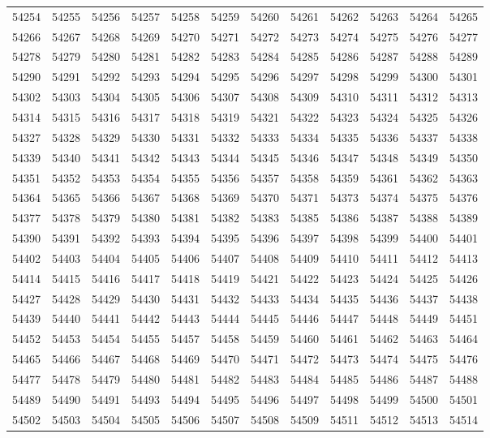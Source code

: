 \begin{center}
\begin{longtable}{llllllllllll}
54254 &54255 &54256 &54257 &54258 &54259 &54260 &54261 &54262 &54263 &54264 &54265 \\
54266 &54267 &54268 &54269 &54270 &54271 &54272 &54273 &54274 &54275 &54276 &54277 \\
54278 &54279 &54280 &54281 &54282 &54283 &54284 &54285 &54286 &54287 &54288 &54289 \\
54290 &54291 &54292 &54293 &54294 &54295 &54296 &54297 &54298 &54299 &54300 &54301 \\
54302 &54303 &54304 &54305 &54306 &54307 &54308 &54309 &54310 &54311 &54312 &54313 \\
54314 &54315 &54316 &54317 &54318 &54319 &54321 &54322 &54323 &54324 &54325 &54326 \\
54327 &54328 &54329 &54330 &54331 &54332 &54333 &54334 &54335 &54336 &54337 &54338 \\
54339 &54340 &54341 &54342 &54343 &54344 &54345 &54346 &54347 &54348 &54349 &54350 \\
54351 &54352 &54353 &54354 &54355 &54356 &54357 &54358 &54359 &54361 &54362 &54363 \\
54364 &54365 &54366 &54367 &54368 &54369 &54370 &54371 &54373 &54374 &54375 &54376 \\
54377 &54378 &54379 &54380 &54381 &54382 &54383 &54385 &54386 &54387 &54388 &54389 \\
54390 &54391 &54392 &54393 &54394 &54395 &54396 &54397 &54398 &54399 &54400 &54401 \\
54402 &54403 &54404 &54405 &54406 &54407 &54408 &54409 &54410 &54411 &54412 &54413 \\
54414 &54415 &54416 &54417 &54418 &54419 &54421 &54422 &54423 &54424 &54425 &54426 \\
54427 &54428 &54429 &54430 &54431 &54432 &54433 &54434 &54435 &54436 &54437 &54438 \\
54439 &54440 &54441 &54442 &54443 &54444 &54445 &54446 &54447 &54448 &54449 &54451 \\
54452 &54453 &54454 &54455 &54457 &54458 &54459 &54460 &54461 &54462 &54463 &54464 \\
54465 &54466 &54467 &54468 &54469 &54470 &54471 &54472 &54473 &54474 &54475 &54476 \\
54477 &54478 &54479 &54480 &54481 &54482 &54483 &54484 &54485 &54486 &54487 &54488 \\
54489 &54490 &54491 &54493 &54494 &54495 &54496 &54497 &54498 &54499 &54500 &54501 \\
54502 &54503 &54504 &54505 &54506 &54507 &54508 &54509 &54511 &54512 &54513 &54514 \\

\end{longtable}
\end{center}
